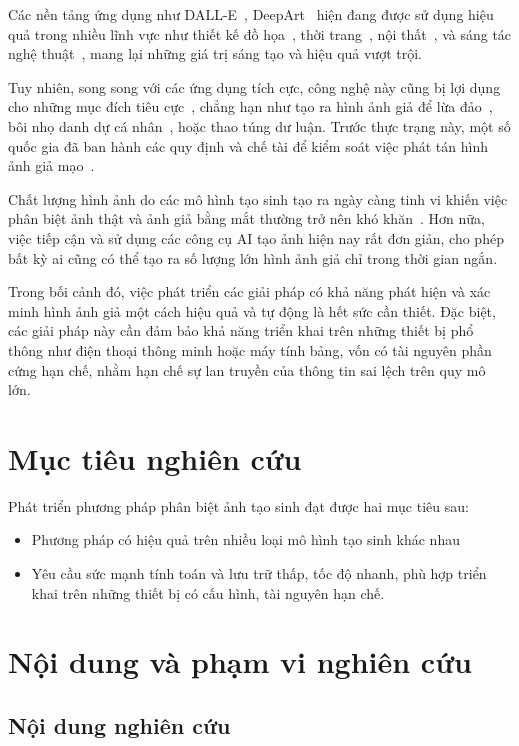 Các nền tảng ứng dụng như DALL-E~\cite{dalle2}, DeepArt~\cite{deepart} hiện đang được sử dụng hiệu quả trong nhiều lĩnh vực như thiết kế đồ họa~\cite{CasteleiroPitrez2024GenerativeAI,Shin2024CanPM}, thời trang~\cite{8769486}, nội thất~\cite{Chen2020ApplicationOA}, và sáng tác nghệ thuật~\cite{Ai_won_an_art_contest}, mang lại những giá trị sáng tạo và hiệu quả vượt trội.

Tuy nhiên, song song với các ứng dụng tích cực, công nghệ này cũng bị lợi dụng cho những mục đích tiêu cực~\cite{DBLP-abs-2107-10139}, chẳng hạn như tạo ra hình ảnh giả để lừa đảo~\cite{Ai_chief_financial_officer}, bôi nhọ danh dự cá nhân~\cite{VirginiaDeepfake}, hoặc thao túng dư luận. Trước thực trạng này, một số quốc gia đã ban hành các quy định và chế tài để kiểm soát việc phát tán hình ảnh giả mạo~\cite{CaliforniaDeepfakes}.

Chất lượng hình ảnh do các mô hình tạo sinh tạo ra ngày càng tinh vi khiến việc phân biệt ảnh thật và ảnh giả bằng mắt thường trở nên khó khăn~\cite{spottingai}. Hơn nữa, việc tiếp cận và sử dụng các công cụ AI tạo ảnh hiện nay rất đơn giản, cho phép bất kỳ ai cũng có thể tạo ra số lượng lớn hình ảnh giả chỉ trong thời gian ngắn.

Trong bối cảnh đó, việc phát triển các giải pháp có khả năng phát hiện và xác minh hình ảnh giả một cách hiệu quả và tự động là hết sức cần thiết. Đặc biệt, các giải pháp này cần đảm bảo khả năng triển khai trên những thiết bị phổ thông như điện thoại thông minh hoặc máy tính bảng, vốn có tài nguyên phần cứng hạn chế, nhằm hạn chế sự lan truyền của thông tin sai lệch trên quy mô lớn.


\section{Mục tiêu nghiên cứu}
Phát triển phương pháp phân biệt ảnh tạo sinh đạt được hai mục tiêu sau:
\begin{itemize}
	\item Phương pháp có hiệu quả trên nhiều loại mô hình tạo sinh khác nhau
	\item Yêu cầu sức mạnh tính toán và lưu trữ thấp, tốc độ nhanh, phù hợp triển khai trên những thiết bị có cấu hình, tài nguyên hạn chế.
\end{itemize}
%
\section{Nội dung và phạm vi nghiên cứu}

\subsection{Nội dung nghiên cứu}

